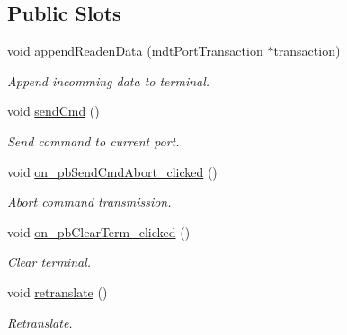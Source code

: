 \subsection*{Public Slots}
\begin{DoxyCompactItemize}
\item 
\hypertarget{classmdt_port_term_a2c8de2e82437fc94420ccb542cc42bf2}{
void \hyperlink{classmdt_port_term_a2c8de2e82437fc94420ccb542cc42bf2}{appendReadenData} (\hyperlink{classmdt_port_transaction}{mdtPortTransaction} $\ast$transaction)}
\label{classmdt_port_term_a2c8de2e82437fc94420ccb542cc42bf2}

\begin{DoxyCompactList}\small\item\em Append incomming data to terminal. \end{DoxyCompactList}\item 
\hypertarget{classmdt_port_term_a7ec568c44f862fe7aee83f1a271ac6bb}{
void \hyperlink{classmdt_port_term_a7ec568c44f862fe7aee83f1a271ac6bb}{sendCmd} ()}
\label{classmdt_port_term_a7ec568c44f862fe7aee83f1a271ac6bb}

\begin{DoxyCompactList}\small\item\em Send command to current port. \end{DoxyCompactList}\item 
\hypertarget{classmdt_port_term_a1b232e686b401d7103eb1c682be330a9}{
void \hyperlink{classmdt_port_term_a1b232e686b401d7103eb1c682be330a9}{on\_\-pbSendCmdAbort\_\-clicked} ()}
\label{classmdt_port_term_a1b232e686b401d7103eb1c682be330a9}

\begin{DoxyCompactList}\small\item\em Abort command transmission. \end{DoxyCompactList}\item 
\hypertarget{classmdt_port_term_abb3fc55837782dbea240b069a48b18ce}{
void \hyperlink{classmdt_port_term_abb3fc55837782dbea240b069a48b18ce}{on\_\-pbClearTerm\_\-clicked} ()}
\label{classmdt_port_term_abb3fc55837782dbea240b069a48b18ce}

\begin{DoxyCompactList}\small\item\em Clear terminal. \end{DoxyCompactList}\item 
void \hyperlink{classmdt_port_term_a542e20f789bcdc5f2ddf2b6e698ceea2}{retranslate} ()
\begin{DoxyCompactList}\small\item\em Retranslate. \end{DoxyCompactList}\end{DoxyCompactItemize}
